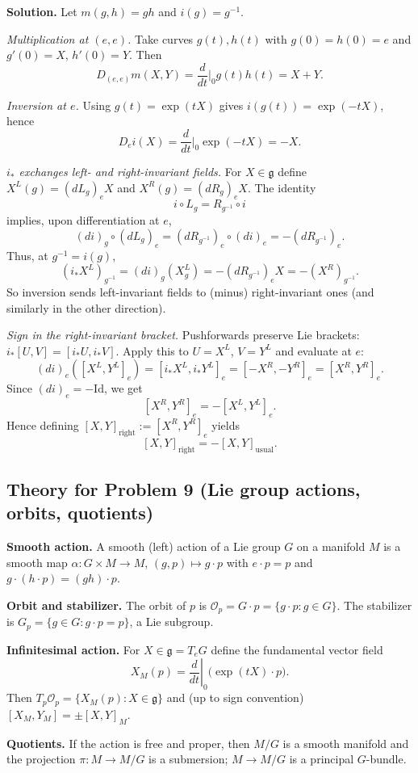 \documentclass[12pt,a4paper]{article}
\theoremstyle{plain}
\theoremstyle{definition}      %
\begin{document}
\textbf{Solution.}
Let $m(g,h)=gh$ and $i(g)=g^{-1}$.

\emph{Multiplication at $(e,e)$.}
Take curves $g(t),h(t)$ with $g(0)=h(0)=e$ and $g'(0)=X$, $h'(0)=Y$. Then
\[
D_{(e,e)}m(X,Y)=\frac{d}{dt}\Big|_{0}g(t)h(t)=X+Y.
\]

\emph{Inversion at $e$.}
Using $g(t)=\exp(tX)$ gives $i(g(t))=\exp(-tX)$, hence
\[
D_e i(X)=\frac{d}{dt}\Big|_{0}\exp(-tX)=-X.
\]

\emph{$i_*$ exchanges left- and right-invariant fields.}
For $X\in\mathfrak g$ define $X^L(g)=(dL_g)_eX$ and $X^R(g)=(dR_g)_eX$.
The identity
\[
i\circ L_g = R_{g^{-1}}\circ i
\]
implies, upon differentiation at $e$,
\[
(d i)_g\circ(dL_g)_e=(dR_{g^{-1}})_e\circ(d i)_e=-(dR_{g^{-1}})_e.
\]
Thus, at $g^{-1}=i(g)$,
\[
(i_*X^L)_{g^{-1}}=(d i)_g(X^L_g)=-(dR_{g^{-1}})_eX=-(X^R)_{g^{-1}}.
\]
So inversion sends left-invariant fields to (minus) right-invariant ones (and similarly in the other direction).

\emph{Sign in the right-invariant bracket.}
Pushforwards preserve Lie brackets: $i_*[U,V]=[i_*U,i_*V]$. Apply this to $U=X^L$, $V=Y^L$ and evaluate at $e$:
\[
(d i)_e([X^L,Y^L]_e)=[i_*X^L,i_*Y^L]_e=[-X^R,-Y^R]_e=[X^R,Y^R]_e.
\]
Since $(d i)_e=-\mathrm{Id}$, we get
\[
[X^R,Y^R]_e=-[X^L,Y^L]_e.
\]
Hence defining $[X,Y]_{\mathrm{right}}:=[X^R,Y^R]_e$ yields
\[
[X,Y]_{\mathrm{right}}=-[X,Y]_{\mathrm{usual}}.
\]

\subsection*{Theory for Problem 9 (Lie group actions, orbits, quotients)}

\textbf{Smooth action.}
A smooth (left) action of a Lie group $G$ on a manifold $M$ is a smooth map
$\alpha:G\times M\to M$, $(g,p)\mapsto g\cdot p$ with $e\cdot p=p$ and
$g\cdot(h\cdot p)=(gh)\cdot p$.

\textbf{Orbit and stabilizer.}
The orbit of $p$ is $\mathcal O_p=G\cdot p=\{g\cdot p:g\in G\}$.
The stabilizer is $G_p=\{g\in G:g\cdot p=p\}$, a Lie subgroup.

\textbf{Infinitesimal action.}
For $X\in\mathfrak g=T_eG$ define the fundamental vector field
\[
X_M(p)=\left.\frac{d}{dt}\right|_0 \big(\exp(tX)\cdot p\big).
\]
Then $T_p\mathcal O_p=\{X_M(p):X\in\mathfrak g\}$ and (up to sign convention)
$[X_M,Y_M]=\pm [X,Y]_M$.

\textbf{Quotients.}
If the action is free and proper, then $M/G$ is a smooth manifold and the projection
$\pi:M\to M/G$ is a submersion; $M\to M/G$ is a principal $G$-bundle.
\end{document}
